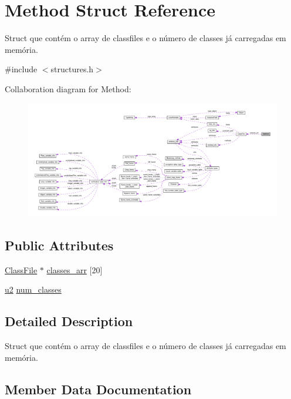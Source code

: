 \hypertarget{structMethod}{}\section{Method Struct Reference}
\label{structMethod}


Struct que contém o array de classfiles e o número de classes já carregadas em memória.  




{\ttfamily \#include $<$structures.\+h$>$}



Collaboration diagram for Method\+:
\nopagebreak
\begin{figure}[H]
\begin{center}
\leavevmode
\includegraphics[width=350pt]{structMethod__coll__graph}
\end{center}
\end{figure}
\subsection*{Public Attributes}
\begin{DoxyCompactItemize}
\item 
\hyperlink{structClassFile}{Class\+File} $\ast$ \hyperlink{structMethod_ace741cd234df7db5849ee2af75870b8c}{classes\+\_\+arr} \mbox{[}20\mbox{]}
\item 
\hyperlink{structures_8h_a55ef8d87fd202b8417704c089899c5b9}{u2} \hyperlink{structMethod_a40dccf4ca5a8d3a74798917a888be720}{num\+\_\+classes}
\end{DoxyCompactItemize}


\subsection{Detailed Description}
Struct que contém o array de classfiles e o número de classes já carregadas em memória. 

\subsection{Member Data Documentation}
